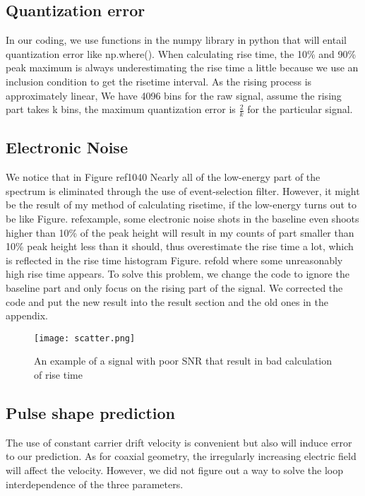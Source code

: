 \subsection{Quantization error}
In our coding, we use functions in the numpy library in python that will entail quantization error like np.where(). When calculating rise time, the 10\% and 90\% peak maximum is always underestimating the rise time a little because we use an inclusion condition to get the risetime interval. As the rising process is approximately linear, We have 4096 bins for the raw signal, assume the rising part takes k bins, the maximum quantization error is $\frac{2}{k}$ for the particular signal.

\subsection{Electronic Noise}
We notice that in Figure ref{1040} Nearly all of the low-energy part of the spectrum is eliminated through the use of event-selection filter. However, it might be the result of my method of calculating risetime, if the low-energy turns out to be like Figure. ref{example}, some electronic noise shots in the baseline even shoots higher than 10\% of the peak height will result in my counts of part smaller than 10\% peak height less than it should, thus overestimate the rise time a lot, which is reflected in the rise time histogram Figure. ref{old} where some unreasonably high rise time appears. To solve this problem, we change the code to ignore the baseline part and only focus on the rising part of the signal. We corrected the code and put the new result into the result section and the old ones in the appendix.
\begin{figure}[h!]
\begin{center}
\texttt{[image: scatter.png]}
\caption{An example of a signal with poor SNR that result in bad calculation of rise time}
\label{example}
\end{center}
\end{figure}

\subsection{Pulse shape prediction}
The use of constant carrier drift velocity is convenient but also will induce error to our prediction. As for coaxial geometry, the irregularly increasing electric field will affect the velocity. However, we did not figure out a way to solve the loop interdependence of the three parameters.\\

